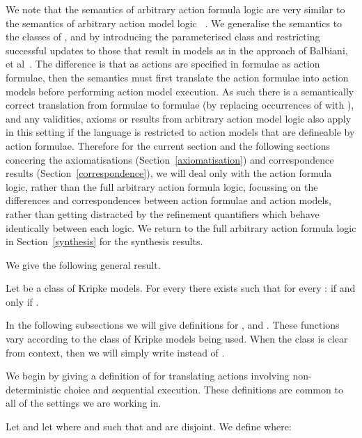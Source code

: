 \documentclass[twoside]{aiml14}
\begin{document}
  We note that the semantics of arbitrary action formula logic \logicAaflC{} are very similar
  to the semantics of arbitrary action model logic \logicAamlC{}~\cite{hales2013}. 
  We generalise the semantics to the classes of \classK{}, \classKFF{} and
  \classS{} by introducing the parameterised class \classC{} and restricting
  successful updates to those that result in \classC{} models as in the
  approach of Balbiani, et al~\cite{balbiani2012}.
  The difference is that as actions are specified in \langAafl{} formulae as
  action formulae, then the semantics must first translate the action formulae
  into action models before performing action model execution. As such there is
  a semantically correct translation from \langAafl{} formulae to \langAaml{}
  formulae (by replacing occurrences of  with ),
  and any validities, axioms or results from arbitrary action model logic also
  apply in this setting if the language is restricted to action models that are
  defineable by action formulae. Therefore for the current section and the
  following sections concering the axiomatisations
  (Section~\ref{axiomatisation}) and correspondence results
  (Section~\ref{correspondence}), we will deal only with the action formula
  logic, rather than the full arbitrary action formula logic, focussing on the
  differences and correspondences between action formulae and action models,
  rather than getting distracted by the refinement quantifiers which behave
  identically between each logic. We return to the full arbitrary action
  formula logic in Section~\ref{synthesis} for the synthesis results.

  We give the following general result.

  \begin{proposition}
      Let  be a class of Kripke models. For every 
      there exists  
      such that for every : 
       if and only if
      .
  \end{proposition}

  In the following subsections we will give definitions for ,
   and . These functions vary according to the
  class of Kripke models being used. When the class is clear from context, then
  we will simply write  instead of .

  We begin by giving a definition of  for translating actions involving
  non-deterministic choice and sequential execution. These definitions are
  common to all of the settings we are working in.

  \begin{definition}\label{afl-choice}
      Let 
      and let  
      where 
      and 
      such that  and  are disjoint.
      We define  where:
      
  \end{definition}
\end{document}
